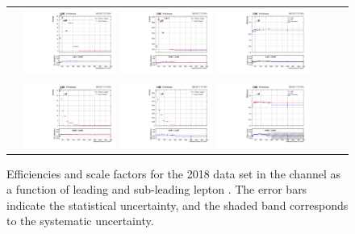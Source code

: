 \begin{figure}[!htb]
  \begin{center}
    \begin{tabular}{ccc}
      \includegraphics[width=0.30\textwidth]{fig_2018_TrigSF/g_lepApt_mumu_MC.pdf}
      \includegraphics[width=0.30\textwidth]{fig_2018_TrigSF/g_lepApt_mumu_data.pdf}
      \includegraphics[width=0.30\textwidth]{fig_2018_TrigSF/g_mumu_lepApt_FullSystUncBand.pdf}\\
      \includegraphics[width=0.30\textwidth]{fig_2018_TrigSF/g_lepBpt_mumu_MC.pdf}
      \includegraphics[width=0.30\textwidth]{fig_2018_TrigSF/g_lepBpt_mumu_data.pdf}
      \includegraphics[width=0.30\textwidth]{fig_2018_TrigSF/g_mumu_lepBpt_FullSystUncBand.pdf}\\
    \end{tabular}
    \caption{Efficiencies and scale factors for the 2018 data set in the \mumu channel as a function of leading and sub-leading lepton \pT.
            The error bars indicate the statistical uncertainty, and the shaded band corresponds to the systematic uncertainty.
            }
    \label{TrigSF_2018_3}
  \end{center}
\end{figure}


